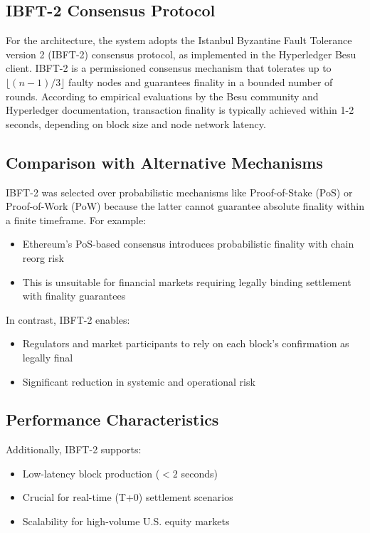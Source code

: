 \documentclass[conference]{IEEEtran}
\begin{document}
\subsection{IBFT-2 Consensus Protocol}
For the architecture, the system adopts the Istanbul Byzantine Fault Tolerance version 2 (IBFT-2) consensus protocol, as implemented in the Hyperledger Besu client. IBFT-2 is a permissioned consensus mechanism that tolerates up to $\lfloor(n-1)/3\rfloor$ faulty nodes and guarantees finality in a bounded number of rounds. According to empirical evaluations by the Besu community and Hyperledger documentation, transaction finality is typically achieved within 1-2 seconds, depending on block size and node network latency.

\subsection{Comparison with Alternative Mechanisms}
IBFT-2 was selected over probabilistic mechanisms like Proof-of-Stake (PoS) or Proof-of-Work (PoW) because the latter cannot guarantee absolute finality within a finite timeframe. For example:
\begin{itemize}
    \item Ethereum's PoS-based consensus introduces probabilistic finality with chain reorg risk
    \item This is unsuitable for financial markets requiring legally binding settlement with finality guarantees
\end{itemize}

In contrast, IBFT-2 enables:
\begin{itemize}
    \item Regulators and market participants to rely on each block's confirmation as legally final
    \item Significant reduction in systemic and operational risk
\end{itemize}

\subsection{Performance Characteristics}
Additionally, IBFT-2 supports:
\begin{itemize}
    \item Low-latency block production ($<2$ seconds)
    \item Crucial for real-time (T+0) settlement scenarios
    \item Scalability for high-volume U.S. equity markets
\end{itemize}
\end{document}
